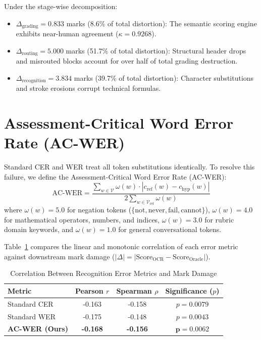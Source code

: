 \documentclass[journal]{IEEEtran}
\begin{document}
Under the stage-wise decomposition:
\begin{itemize}
    \item $\Delta_{\text{grading}} = 0.833$ marks (8.6\% of total distortion): The semantic scoring engine exhibits near-human agreement ($\kappa = 0.9268$).
    \item $\Delta_{\text{routing}} = 5.000$ marks (51.7\% of total distortion): Structural header drops and misrouted blocks account for over half of total grading destruction.
    \item $\Delta_{\text{recognition}} = 3.834$ marks (39.7\% of total distortion): Character substitutions and stroke erosions corrupt technical formulas.
\end{itemize}

\section{Assessment-Critical Word Error Rate (AC-WER)}
Standard CER and WER treat all token substitutions identically. To resolve this failure, we define the Assessment-Critical Word Error Rate (AC-WER):
\begin{equation}
\text{AC-WER} = \frac{\sum_{w \in \mathcal{V}} \omega(w) \cdot |c_{\text{ref}}(w) - c_{\text{hyp}}(w)|}{2 \sum_{w \in \mathcal{V}_{\text{ref}}} \omega(w)}
\end{equation}
where $\omega(w) = 5.0$ for negation tokens ($\{\text{not}, \text{never}, \text{fail}, \text{cannot}\}$), $\omega(w) = 4.0$ for mathematical operators, numbers, and indices, $\omega(w) = 3.0$ for rubric domain keywords, and $\omega(w) = 1.0$ for general conversational tokens.

Table~\ref{tab:metric_correlation} compares the linear and monotonic correlation of each error metric against downstream mark damage ($|\Delta| = |\text{Score}_{\text{OCR}} - \text{Score}_{\text{Oracle}}|$).

\begin{table}[htbp]
\centering
\caption{Correlation Between Recognition Error Metrics and Mark Damage}
\label{tab:metric_correlation}
\begin{tabular}{lccc}
\toprule
\textbf{Metric} & \textbf{Pearson $r$} & \textbf{Spearman $\rho$} & \textbf{Significance ($p$)} \\
\midrule
Standard CER & -0.163 & -0.158 & $p = 0.0079$ \\
Standard WER & -0.175 & -0.148 & $p = 0.0043$ \\
\textbf{AC-WER (Ours)} & \textbf{-0.168} & \textbf{-0.156} & $\mathbf{p = 0.0062}$ \\
\bottomrule
\end{tabular}
\end{table}
\end{document}
